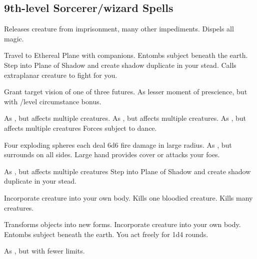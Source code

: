 \subsection{9th-level Sorcerer/wizard Spells} 
\begin{swspelllist}
 Releases creature from imprisonment, many other impediments.
 Dispels all magic.

 Travel to Ethereal Plane with companions.
 Entombs subject beneath the earth.
 Step into Plane of Shadow and create shadow duplicate in your stead.
 Calls extraplanar creature to fight for you.
\spellheadrestricted{}

 Grant target vision of one of three futures.
 As lesser moment of prescience, but with /level circumstance bonus.

 As , but affects multiple creatures.
 As , but affects multiple creatures.
 As , but affects multiple creatures
 Forces subject to dance.

 Four exploding spheres each deal 6d6 fire damage in large radius.
 As , but surrounds on all sides.
 Large hand provides cover or attacks your foes.

 As , but affects multiple creatures
 Step into Plane of Shadow and create shadow duplicate in your stead.

 Incorporate creature into your own body.
 Kills one bloodied creature.
 Kills many creatures.

 Transforms objects into new forms.
 Incorporate creature into your own body.
 Entombs subject beneath the earth.
 You act freely for 1d4 rounds.

\M As , but with fewer limits.
\end{swspelllist}

